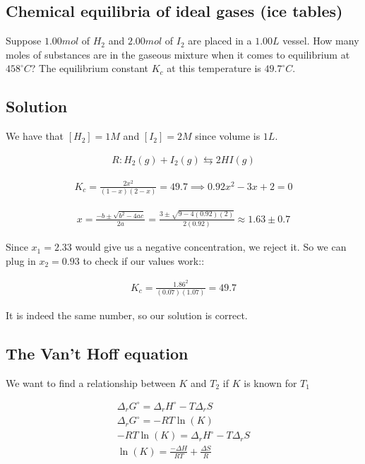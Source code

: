 \documentclass[12pt]{book}
\begin{document}
\subsection*{Chemical equilibria of ideal gases (ice tables)}

Suppose $1.00 mol$ of $H_2$ and $2.00 mol$ of $I_2$ are placed in a $1.00L$ vessel. How many
moles of substances are in the gaseous mixture when it comes to equilibrium at
$458^{\circ}C$? The equilibrium constant $K_c$ at this temperature is $49.7^{\circ} C$.

\subsection*{Solution}

We have that $[H_2]=1M$ and $[I_2]=2M$ since volume is $1L$.

\begin{align*}
    R:H_2(g)+I_2(g)\leftrightarrows 2HI(g)
\end{align*}

\begin{align*}
    K_c=\frac{2x^2}{(1-x)(2-x)}=49.7\implies 0.92x^2-3x+2=0
\end{align*}

\begin{align*}
    x=\frac{-b\pm\sqrt{b^2-4ac}}{2a}=\frac{3\pm\sqrt{9-4(0.92)(2)}}{2(0.92)}\approx 1.63\pm 0.7
\end{align*}

Since $x_1=2.33$ would give us a negative concentration, we reject it. So we can plug in $x_2=0.93$ to check if our values work::

\begin{align*}
    K_c=\frac{1.86^2}{(0.07)(1.07)}=49.7
\end{align*}

It is indeed the same number, so our solution is correct.

\subsection*{The Van't Hoff equation}

We want to find a relationship between $K$ and $T_2$ if $K$ is known for $T_1$

\begin{align*}
    \Delta_r G^{\circ}=\Delta_r H^{\circ}-T\Delta_r S\\
    \Delta_r G^{\circ}=-RT\ln(K)\\
    -RT\ln(K)=\Delta_r H^{\circ}-T\Delta_r S\\
    \ln(K)=\frac{-\Delta H}{RT}+\frac{\Delta S}{R}
\end{align*}
\end{document}
